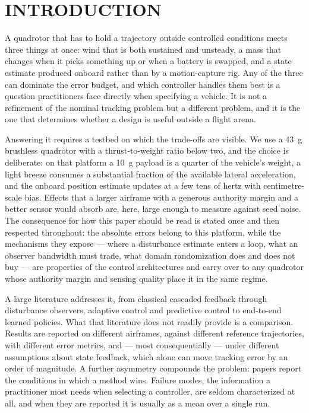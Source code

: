 \section{INTRODUCTION}
\label{sec:intro}

A quadrotor that has to hold a trajectory outside controlled conditions meets three
things at once: wind that is both sustained and unsteady, a mass that changes when it
picks something up or when a battery is swapped, and a state estimate produced onboard
rather than by a motion-capture rig. Any of the three can dominate the error budget, and
which controller handles them best is a question practitioners face directly when
specifying a vehicle. It is not a refinement of the nominal tracking problem but a
different problem, and it is the one that determines whether a design is useful outside
a flight arena.

Answering it requires a testbed on which the trade-offs are visible. We use a
\SI{43}{\gram} brushless quadrotor with a thrust-to-weight ratio below two, and the
choice is deliberate: on that platform a \SI{10}{\gram} payload is a quarter of the
vehicle's weight, a light breeze consumes a substantial fraction of the available
lateral acceleration, and the onboard position estimate updates at a few tens of hertz
with centimetre-scale bias. Effects that a larger airframe with a generous authority
margin and a better sensor would absorb are, here, large enough to measure against seed
noise. The consequence for how this paper should be read is stated once and then
respected throughout: the absolute errors belong to this platform, while the mechanisms
they expose --- where a disturbance estimate enters a loop, what an observer bandwidth
must trade, what domain randomization does and does not buy --- are properties of the
control architectures and carry over to any quadrotor whose authority margin and sensing
quality place it in the same regime.

A large literature addresses it, from classical cascaded feedback through disturbance
observers, adaptive control and predictive control to end-to-end learned policies. What
that literature does not readily provide is a comparison. Results are reported on
different airframes, against different reference trajectories, with different error
metrics, and --- most consequentially --- under different assumptions about state
feedback, which alone can move tracking error by an order of magnitude. A further
asymmetry compounds the problem: papers report the conditions in which a method wins.
Failure modes, the information a practitioner most needs when selecting a controller,
are seldom characterized at all, and when they are reported it is usually as a mean over
a single run.

